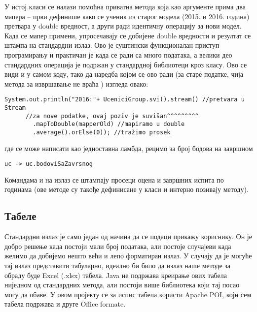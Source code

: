 У истој класи се налази помоћна приватна метода  која као аргументе прима два мапера -- први дефинише како се ученик из старог модела (2015. и 2016. година) претвара у double вредност, а други ради идентичну операцију за нови модел. Када се мапер примени, упросечавају се добијене double вредности и резултат се штампа на стандардни излаз. Ово је суштински функционалан приступ програмирању и практичан је када се ради са много података, а велики део стандардних операција је подржан у стандардној библиотеци кроз  класу. Ово се види и у самом коду, тако да наредба којом се ово ради (за старе податке, чија метода за извршавање не враћа ) изгледа овако:
\begin{verbatim}
System.out.println("2016:"+ UceniciGroup.svi().stream() //pretvara u Stream
      //za nove podatke, ovaj poziv je suvišan^^^^^^^^^
        .mapToDouble(mapperOld) //mapiramo u double
        .average().orElse(0)); //tražimo prosek
\end{verbatim}
где се  може написати као једноставна ламбда, рецимо за број бодова на завршном
\begin{verbatim}
uc -> uc.bodoviSaZavrsnog
\end{verbatim}
Командама  и  на излаз се штампају просеци оцена и завршних испита по годинама (ове методе су такође дефинисане у класи  и интерно позивају  методу).

\subsection{Табеле}\label{subs:spreadsheets}

Стандардни излаз је само један од начина да се подаци прикажу кориснику. Он је добро решење када постоји мали број података, али постоје случајеви када желимо да добијемо нешто већи и лепо форматиран излаз. У случају да је могуће тај излаз представити табуларно, идеално би било да излаз наше методе за обраду буде Excel (.xlsx) табела. Java не подржава креирање ових табела ниједном од стандардних метода, али постоји више библиотека који тај посао могу да обаве. У овом пројекту се за испис табела користи Apache POI, који сем табела подржава и друге Office formate.

